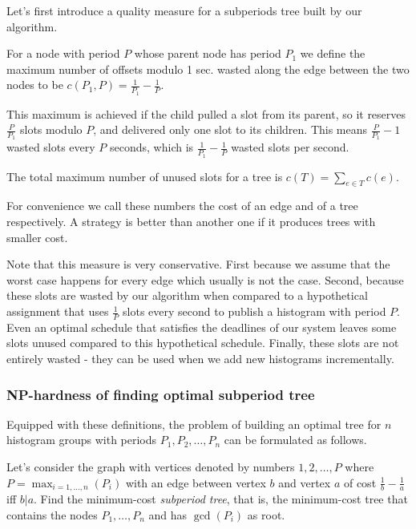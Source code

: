 Let's first introduce a quality measure for a subperiods tree built by our algorithm. 

\begin{definition}
For a node with period $P$ whose parent node has period $P_1$ we define the maximum number of offsets modulo 1 sec. wasted along the edge between the two nodes to be $c(P_1,P)=\frac{1}{P_1}-\frac 1 P$.
\end{definition}

This maximum is achieved if the child pulled a slot from its parent, so it reserves $\frac P {P_1}$ slots modulo $P$, and delivered only one slot to its children. This means $\frac P {P_1}-1$ wasted slots every $P$ seconds, which is $\frac 1 {P_1}- \frac 1 P$ wasted slots per second. 

\begin{definition}
The total maximum number of unused slots for a tree is $c(T)=\sum_{e\in T}c(e)$. 
\end{definition}

For convenience we call these numbers the cost of an edge and of a tree respectively. A strategy is better than another one if it produces trees with smaller cost. 

Note that this measure is very conservative. First because we assume that the worst case happens for every edge which usually is not the case. Second, because these slots are wasted by our algorithm when compared to a hypothetical assignment that uses $\frac 1 P$ slots every second to publish a histogram with period $P$. Even an optimal schedule that satisfies the deadlines of our system leaves some slots unused compared to this hypothetical schedule. Finally, these slots are not entirely wasted - they can be used when we add new histograms incrementally.

\subsubsection*{NP-hardness of finding optimal subperiod tree}

Equipped with these definitions, the problem of building an optimal tree for $n$ histogram groups with periods $P_1, P_2, \ldots,P_n$ can be formulated as follows. 

\begin{problem}
Let's consider the graph with vertices denoted by numbers $1,2,\ldots ,P$ where $P=\max_{i=1,\ldots,n}(P_i)$ with an edge between vertex $b$ and vertex $a$ of cost $\frac 1 b -\frac 1 a$ iff $b \vert a$. Find the minimum-cost \emph{subperiod tree}, that is, the minimum-cost tree that contains the nodes $P_1,\ldots,P_n$ and has $\gcd(P_i)$ as root.
\end{problem}

